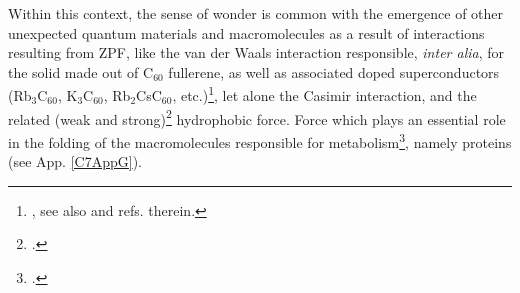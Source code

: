 \begin{subappendices}
 Within this context, the sense of wonder is common with the emergence of other unexpected quantum materials and macromolecules as a result of interactions resulting from ZPF, like the van der Waals interaction responsible, \textit{inter alia}, for the  solid made out of C$_{60}$ fullerene, as well as associated doped superconductors (Rb$_3$C$_{60}$, K$_3$C$_{60}$, Rb$_2$CsC$_{60}$, etc.)\footnote{\cite{Hebard:91,Rosseinsky:91,Holczer:91,Fleming:91,Anderson:91,Zhou:92,Hebard:92,Gunnarsson:95,Gunnarsson:97,Gunnarsson:04}, see also \cite{Broglia:04b} and refs. therein.}, let alone the Casimir interaction, and the related (weak and strong)\footnote{\cite{Chandler:02}.} hydrophobic force. Force which plays an essential role in the folding of the macromolecules responsible for metabolism\footnote{\cite{Dyson:99}.}, namely proteins (see App. \ref{C7AppG}).





\end{subappendices}
